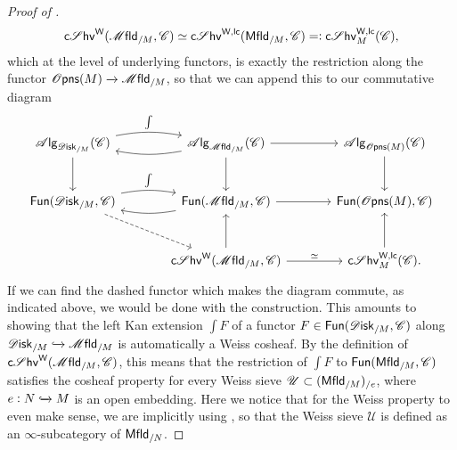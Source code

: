 \documentclass[../text.tex]{subfiles}
\begin{document}
\begin{proof}[Proof of {}]
\begin{equation}
        \csheaves[W](\mfld_{/M}, \catC) \simeq \csheaves[W, lc](\mfld[r]_{/M}, \catC) =: \csheaves[W, lc]_M(\catC),
    \end{equation}
    which at the level of underlying functors, is exactly the restriction along the functor $\opens(M) \xrightarrow{} \mfld_{/M}$, so that we can append this to our commutative diagram
    \begin{equation}
        \begin{tikzcd}[row sep = large, column sep = large]
            \alg{\disk_{/M}} (\catC) \arrow[r, bend left=10, "\int"] \arrow[d] & \alg{\mfld_{/M}} (\catC) \arrow[l, bend left=10] \arrow[r] \arrow[d] & \alg{\opens(M)} (\catC) \arrow[d] \\
            \mathsf{Fun}(\disk_{/M}, \catC) \arrow[r, bend left=10, "\int"] \arrow[dr, dashed] & \mathsf{Fun}(\mfld_{/M}, \catC) \arrow[l, bend left=10] \arrow[r] & \mathsf{Fun}(\opens(M), \catC) \\
            & \csheaves[W](\mfld_{/M}, \catC) \arrow[r, "\simeq"] \arrow[u] & \csheaves[W, lc]_M(\catC) \arrow[u].
        \end{tikzcd}
    \end{equation}
    If we can find the dashed functor which makes the diagram commute, as indicated above, we would be done with the construction. This amounts to showing that the left Kan extension $\int F$ of a functor $F \in \mathsf{Fun}(\disk_{/M}, \catC)$ along $\disk_{/M} \xhookrightarrow{} \mfld_{/M}$ is automatically a Weiss cosheaf. By the definition of $\csheaves[W](\mfld_{/M}, \catC)$, this means that the restriction of $\int F$ to $\mathsf{Fun}(\mfld[r]_{/M}, \catC)$ satisfies the cosheaf property for every Weiss sieve $\mathscr{U} \subset (\mfld[r]_{/M})_{/e}$, where $e:N \xhookrightarrow{} M$ is an open embedding. Here we notice that for the Weiss property to even make sense, we are implicitly using , so that the Weiss sieve $\mathscr{U}$ is defined as an $\infty$-subcategory of $\mfld[r]_{/N}$.
    

\end{proof}
\end{document}

